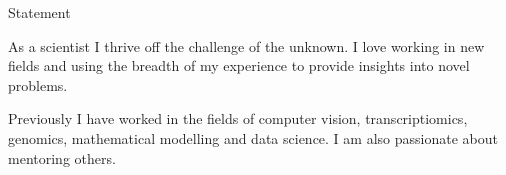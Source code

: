 \begin{rubric}{Statement}
\end{rubric}
    \vspace{-0.5cm}
    As a scientist I thrive off the challenge of the unknown. I love working in
    new fields and using the breadth of my experience to provide insights into
    novel problems.  

    \vspace{0.2cm}

    Previously I have worked in the fields of computer vision, transcriptiomics,
    genomics, mathematical modelling and data science. I am also passionate
    about mentoring others.


